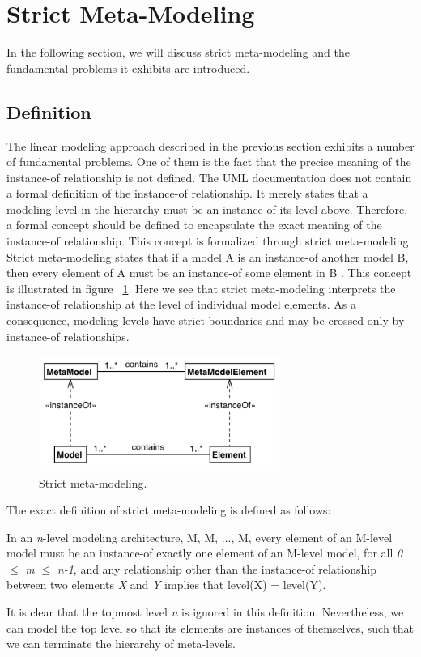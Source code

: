 \section{Strict Meta-Modeling}

In the following section, we will discuss strict meta-modeling and the fundamental problems it exhibits are introduced.

\subsection{Definition}

The linear modeling approach described in the previous section exhibits a number of fundamental problems. One of them is the fact that the precise meaning of the instance-of relationship is not defined. The UML documentation does not contain a formal definition of the instance-of relationship. It merely states that a modeling level in the hierarchy must be an instance of its level above. Therefore, a formal concept should be defined to encapsulate the exact meaning of the instance-of relationship. This concept is formalized through strict meta-modeling. Strict meta-modeling states that if a model A is an instance-of another model B, then every element of A must be an instance-of some element in B \cite{RearchitectingUML}. This concept is illustrated in figure ~\ref{fig:strict_mm}. Here we see that strict meta-modeling interprets the instance-of relationship at the level of individual model elements. As a consequence, modeling levels have strict boundaries and may be crossed only by instance-of relationships.
\begin{figure}[h!]
\centering
\includegraphics[width=0.7\textwidth]{images/chap2_strict_mm.png}
\caption{Strict meta-modeling.}
\label{fig:strict_mm}
\end{figure}
The exact definition of strict meta-modeling is defined as follows:
\begin{mydef}
In an \textit{n}-level modeling architecture, M, M, ..., M, every element of an M-level model must be an instance-of exactly one element of an M-level model, for all \textit{0} $\leq$ \textit{m} $\le$ \textit{n-1}, and any relationship other than the instance-of relationship between two elements \textit{X} and \textit{Y} implies that level(X) = level(Y).
\end{mydef}
It is clear that the topmost level \textit{n} is ignored in this definition. Nevertheless, we can model the top level so that its elements are instances of themselves, such that we can terminate the hierarchy of meta-levels.

